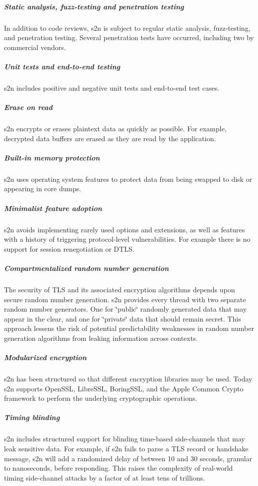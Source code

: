 \subparagraph*{Static analysis, fuzz-\/testing and penetration testing}

In addition to code reviews, s2n is subject to regular static analysis, fuzz-\/testing, and penetration testing. Several penetration tests have occurred, including two by commercial vendors.

\subparagraph*{Unit tests and end-\/to-\/end testing}

s2n includes positive and negative unit tests and end-\/to-\/end test cases.

\subparagraph*{Erase on read}

s2n encrypts or erases plaintext data as quickly as possible. For example, decrypted data buffers are erased as they are read by the application.

\subparagraph*{Built-\/in memory protection}

s2n uses operating system features to protect data from being swapped to disk or appearing in core dumps.

\subparagraph*{Minimalist feature adoption}

s2n avoids implementing rarely used options and extensions, as well as features with a history of triggering protocol-\/level vulnerabilities. For example there is no support for session renegotiation or D\+T\+LS.

\subparagraph*{Compartmentalized random number generation}

The security of T\+LS and its associated encryption algorithms depends upon secure random number generation. s2n provides every thread with two separate random number generators. One for \char`\"{}public\char`\"{} randomly generated data that may appear in the clear, and one for \char`\"{}private\char`\"{} data that should remain secret. This approach lessens the risk of potential predictability weaknesses in random number generation algorithms from leaking information across contexts.

\subparagraph*{Modularized encryption}

s2n has been structured so that different encryption libraries may be used. Today s2n supports Open\+S\+SL, Libre\+S\+SL, Boring\+S\+SL, and the Apple Common Crypto framework to perform the underlying cryptographic operations.

\subparagraph*{Timing blinding}

s2n includes structured support for blinding time-\/based side-\/channels that may leak sensitive data. For example, if s2n fails to parse a T\+LS record or handshake message, s2n will add a randomized delay of between 10 and 30 seconds, granular to nanoseconds, before responding. This raises the complexity of real-\/world timing side-\/channel attacks by a factor of at least tens of trillions.

